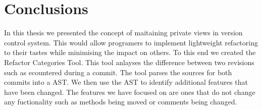 
\chapter{Conclusions}\label{C:con}

In this thesis we presented the concept of maitaining private views in version control system. This would allow programers to implement lightweight refactoring to their tastes while minimising the impact on others.  To this end we created the Refactor Categories Tool. This tool anlayses the difference between two revisions such as ecountered during a commit.  The tool parses the sources for both commits into a AST. We then use the AST to identify additional features that have been changed. The features we have focused on are ones that do not change any fuctionality such as methods being moved or comments being changed.
